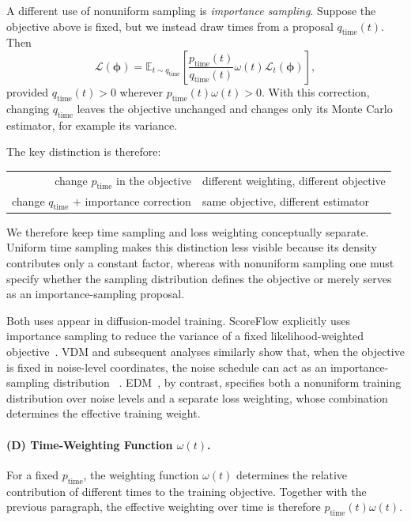 A different use of nonuniform sampling is \emph{importance sampling}.
Suppose the objective above is fixed, but we instead draw times from a proposal
$q_{\text{time}}(t)$. Then
\[
\mathcal{L}(\bm{\phi})
=
\mathbb{E}_{t\sim q_{\text{time}}}
\left[
\frac{p_{\text{time}}(t)}{q_{\text{time}}(t)}
\omega(t)\mathcal{L}_t(\bm{\phi})
\right],
\]
provided $q_{\text{time}}(t)>0$ wherever
$p_{\text{time}}(t)\omega(t)>0$.
With this correction, changing $q_{\text{time}}$ leaves the objective
unchanged and changes only its Monte Carlo estimator, for example its variance.

The key distinction is therefore:
\begin{center}
\small
\renewcommand{\arraystretch}{1.3}
\begin{tabular}{@{}r@{\;\;$\Longrightarrow$\;\;}l@{}}
change $p_{\text{time}}$ in the objective
&
different weighting, different objective
\\
change $q_{\text{time}}$ $+$ importance correction
&
same objective, different estimator
\end{tabular}
\end{center}

We therefore keep time sampling and loss weighting conceptually separate.
Uniform time sampling makes this distinction less visible because its density
contributes only a constant factor, whereas with nonuniform sampling one must
specify whether the sampling distribution defines the objective or merely
serves as an importance-sampling proposal.

Both uses appear in diffusion-model training. ScoreFlow explicitly uses
importance sampling to reduce the variance of a fixed likelihood-weighted
objective~\citep{song2021maximum}. VDM and subsequent analyses similarly show
that, when the objective is fixed in noise-level coordinates, the noise
schedule can act as an importance-sampling distribution
~\citep{kingma2021variational,kingma2023understanding}.
EDM~\citep{karras2022elucidating}, by contrast, specifies both a nonuniform
training distribution over noise levels and a separate loss weighting, whose
combination determines the effective training weight.


\paragraph{(D) Time-Weighting Function $\omega(t)$.}
For a fixed $p_{\text{time}}$, the weighting function $\omega(t)$ determines
the relative contribution of different times to the training objective.
Together with the previous paragraph, the effective weighting over time is
therefore $p_{\text{time}}(t)\omega(t)$.


